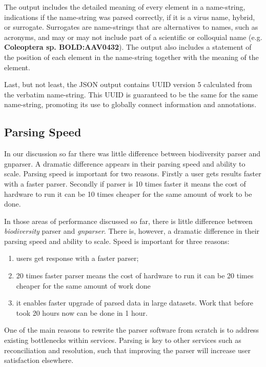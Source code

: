 \documentclass{bmcart}
\begin{document}
The output includes the detailed meaning of every element in a name-string,
indications if the name-string was parsed correctly, if it is a virus name,
hybrid, or surrogate. Surrogates are name-strings that are alternatives to
names, such as acronyms, and may or may not include part of a scientific or
colloquial name (e.g. \textbf{Coleoptera sp. BOLD:AAV0432}). The output also
includes a statement of the position of each element in the name-string
together with the meaning of the element.

Last, but not least, the JSON output contains UUID version 5 calculated from
the verbatim name-string. This UUID is guaranteed to be the same for the same
name-string, promoting its use to globally connect information and annotations.

\subsection*{Parsing Speed}

In our discussion so far there was little difference between biodiversity
parser and gnparser. A dramatic difference appears in their parsing speed and
ability to scale. Parsing speed is important for two reasons. Firstly a user
gets results faster with a faster parser. Secondly if parser is 10 times
faster it means the cost of hardware to run it can be 10 times cheaper for the
same amount of work to be done.

In those areas of performance discussed so far, there is little difference
between \textit{biodiversity} parser and \textit{gnparser}. There is, however,
a dramatic difference in their parsing speed and ability to scale. Speed is
important for three reasons:

\begin{enumerate}

  \item users get response with a faster parser;

  \item 20 times faster parser means the cost of hardware to run it can be
    20 times cheaper for the same amount of work done

  \item it enables faster upgrade of parsed data in large datasets. Work that
    before took 20 hours now can be done in 1 hour.

\end{enumerate}

One of the main reasons to rewrite the parser software from scratch is to
address existing bottlenecks within services. Parsing is key to other services
such as reconciliation and resolution, such that improving the parser will
increase user satisfaction elsewhere.
\end{document}
